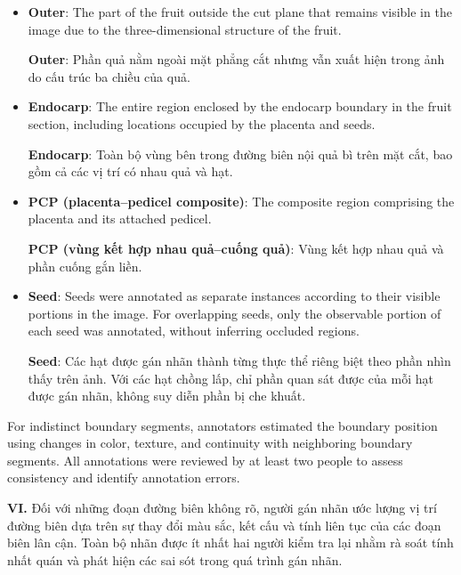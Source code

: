 \documentclass[final,1p,11pt,longtitle]{elsarticle}
\newenvironment{viet}{\par\smallskip\begingroup\color{viColor}\noindent\textbf{VI. }\ignorespaces}{\par\endgroup\smallskip}
\begin{document}
\begin{itemize}
    \item \textbf{Outer}: The part of the fruit outside the cut plane that remains visible in the image due to the three-dimensional structure of the fruit.\par{\color{viColor} \textbf{Outer}: Phần quả nằm ngoài mặt phẳng cắt nhưng vẫn xuất hiện trong ảnh do cấu trúc ba chiều của quả.}
    \item \textbf{Endocarp}: The entire region enclosed by the endocarp boundary in the fruit section, including locations occupied by the placenta and seeds.\par{\color{viColor} \textbf{Endocarp}: Toàn bộ vùng bên trong đường biên nội quả bì trên mặt cắt, bao gồm cả các vị trí có nhau quả và hạt.}
    \item \textbf{PCP (placenta--pedicel composite)}: The composite region comprising the placenta and its attached pedicel.\par{\color{viColor} \textbf{PCP (vùng kết hợp nhau quả--cuống quả)}: Vùng kết hợp nhau quả và phần cuống gắn liền.}
    \item \textbf{Seed}: Seeds were annotated as separate instances according to their visible portions in the image. For overlapping seeds, only the observable portion of each seed was annotated, without inferring occluded regions.\par{\color{viColor} \textbf{Seed}: Các hạt được gán nhãn thành từng thực thể riêng biệt theo phần nhìn thấy trên ảnh. Với các hạt chồng lấp, chỉ phần quan sát được của mỗi hạt được gán nhãn, không suy diễn phần bị che khuất.}
\end{itemize}

For indistinct boundary segments, annotators estimated the boundary position using changes in color, texture, and continuity with neighboring boundary segments. All annotations were reviewed by at least two people to assess consistency and identify annotation errors.

\begin{viet}
Đối với những đoạn đường biên không rõ, người gán nhãn ước lượng vị trí đường biên dựa trên sự thay đổi màu sắc, kết cấu và tính liên tục của các đoạn biên lân cận. Toàn bộ nhãn được ít nhất hai người kiểm tra lại nhằm rà soát tính nhất quán và phát hiện các sai sót trong quá trình gán nhãn.
\end{viet}
\end{document}
